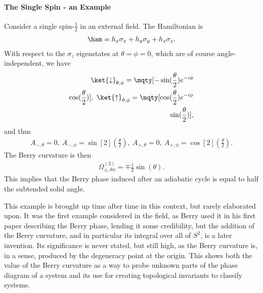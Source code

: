 \paragraph{The Single Spin - an Example}
Consider a single spin-$\frac{1}{2}$ in an external field. The Hamiltonian is
\begin{align*}
	\ham = h_{x}\sigma_{x} + h_{y}\sigma_{y} + h_{z}\sigma_{z}.
\end{align*}
With respect to the $\sigma_{z}$ eigenstates at $\theta = \phi = 0$, which are of course angle-independent, we have
\begin{align}
	\ket{\downarrow}_{\theta, \phi} = \mqty[
		-\sin(\frac{\theta}{2})e^{-i\phi} \\
		\cos(\frac{\theta}{2})
	],\ \ket{\uparrow}_{\theta, \phi} = \mqty[
		\cos(\frac{\theta}{2})e^{-i\phi} \\
		\sin(\frac{\theta}{2})
	],
	\label{eq:spin_angle_states}
\end{align}
and thus
\begin{align*}
	A_{-, \theta} = 0,\ A_{-, \phi} = \sin[2](\frac{\theta}{2}),\ A_{+, \theta} = 0,\ A_{+, \phi} = \cos[2](\frac{\theta}{2}).
\end{align*}
The Berry curvature is then
\begin{align*}
	\Omega^{(2)}_{\pm, \theta\phi} = \mp\frac{1}{2}\sin(\theta).
\end{align*}
This implies that the Berry phase induced after an adiabatic cycle is equal to half the subtended solid angle.

This example is brought up time after time in this context, but rarely elaborated upon. It was the first example considered in the field, as Berry used it in his first paper describing the Berry phase, lending it some credibility, but the addition of the Berry curvature, and in particular its integral over all of $S^{2}$, is a later invention. Its significance is never stated, but still high, as the Berry curvature is, in a sense, produced by the degeneracy point at the origin. This shows both the value of the Berry curvature as a way to probe unknown parts of the phase diagram of a system and its use for creating topological invariants to classify systems.

